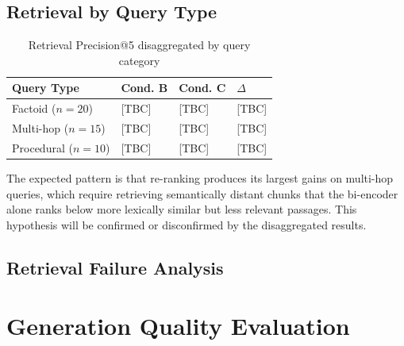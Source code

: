 \subsection{Retrieval by Query Type}

\begin{table}[H]
\centering
\caption{Retrieval Precision@5 disaggregated by query category}
\label{tab:retrieval-by-type}
\begin{tabularx}{\textwidth}{@{}lXXX@{}}
\toprule
\textbf{Query Type} & \textbf{Cond. B} & \textbf{Cond. C} & \textbf{$\Delta$} \\
\midrule
Factoid ($n=20$) & [TBC] & [TBC] & [TBC] \\
Multi-hop ($n=15$) & [TBC] & [TBC] & [TBC] \\
Procedural ($n=10$) & [TBC] & [TBC] & [TBC] \\
\bottomrule
\end{tabularx}
\end{table}


The expected pattern is that re-ranking produces its largest gains on multi-hop queries, which require retrieving semantically distant chunks that the bi-encoder alone ranks below more lexically similar but less relevant passages. This hypothesis will be confirmed or disconfirmed by the disaggregated results.

\subsection{Retrieval Failure Analysis}


\section{Generation Quality Evaluation}
\label{sec:eval-generation}

